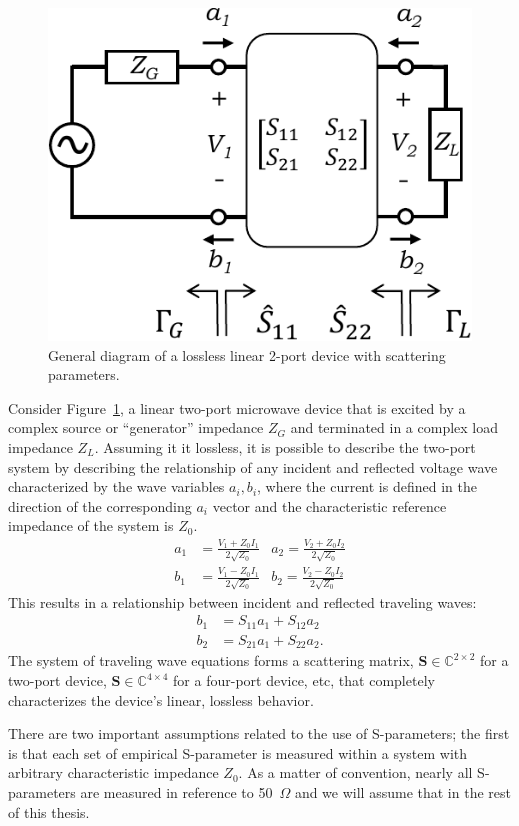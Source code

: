 \begin{figure}[h]
\centering
  \includegraphics[width=0.4\linewidth]{figs/matching/general_2_port}   
    \caption{General diagram of a lossless linear 2-port device with scattering parameters.}
\label{fig_general_2_port}
\end{figure}
	
	Consider Figure~\ref{fig_general_2_port}, a linear two-port microwave device that is excited by a complex source or ``generator'' impedance $Z_G$ and terminated in a complex load impedance $Z_L$.
	Assuming it it lossless, it is possible to describe the two-port system by describing the relationship of any incident and reflected voltage wave characterized by the wave variables $a_i, b_i$, where the current is defined in the direction of the corresponding $a_i$ vector and the characteristic reference impedance of the system is $Z_0$.
\begin{align}
a_1 &= \frac{V_1+Z_0 I_1}{2\sqrt{Z_0}}  &a_2 = \frac{V_2+Z_0 I_2}{2\sqrt{Z_0}} \\
b_1 &= \frac{V_1-Z_0 I_1}{2\sqrt{Z_0}}  &b_2 = \frac{V_2-Z_0 I_2}{2\sqrt{Z_0}}
\end{align}
This results in a relationship between incident and reflected traveling waves:
\begin{align}
	b_1 &= S_{11}a_1 + S_{12}a_2 \\
	b_2 &= S_{21}a_1 + S_{22}a_2.
\end{align}
	The system of traveling wave equations forms a scattering matrix, $\mathbf{S}\in\mathbb{C}^{2\times2}$ for a two-port device, $\mathbf{S}\in\mathbb{C}^{4\times4}$ for a four-port device, etc, that completely characterizes the device's linear, lossless behavior.
	
	There are two important assumptions related to the use of S-parameters; the first is that each set of empirical S-parameter is measured within a system with arbitrary characteristic impedance $Z_0$.
	As a matter of convention, nearly all S-parameters are measured in reference to 50~$\Omega$ and we will assume that in the rest of this thesis.
	
